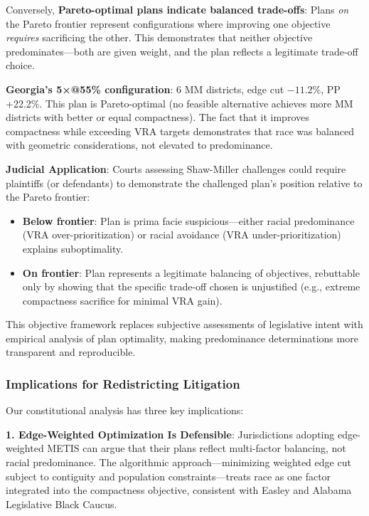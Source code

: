 Conversely, \textbf{Pareto-optimal plans indicate balanced trade-offs}: Plans \emph{on} the Pareto frontier represent configurations where improving one objective \emph{requires} sacrificing the other. This demonstrates that neither objective predominates---both are given weight, and the plan reflects a legitimate trade-off choice.

\textbf{Georgia's 5×@55\% configuration}: 6 MM districts, edge cut $-11.2$\%, PP +22.2\%. This plan is Pareto-optimal (no feasible alternative achieves more MM districts with better or equal compactness). The fact that it improves compactness while exceeding VRA targets demonstrates that race was balanced with geometric considerations, not elevated to predominance.

\textbf{Judicial Application}: Courts assessing Shaw-Miller challenges could require plaintiffs (or defendants) to demonstrate the challenged plan's position relative to the Pareto frontier:
\begin{itemize}
    \item \textbf{Below frontier}: Plan is prima facie suspicious---either racial predominance (VRA over-prioritization) or racial avoidance (VRA under-prioritization) explains suboptimality.
    \item \textbf{On frontier}: Plan represents a legitimate balancing of objectives, rebuttable only by showing that the specific trade-off chosen is unjustified (e.g., extreme compactness sacrifice for minimal VRA gain).
\end{itemize}

This objective framework replaces subjective assessments of legislative intent with empirical analysis of plan optimality, making predominance determinations more transparent and reproducible.

\subsubsection{Implications for Redistricting Litigation}

Our constitutional analysis has three key implications:

\textbf{1. Edge-Weighted Optimization Is Defensible}: Jurisdictions adopting edge-weighted METIS can argue that their plans reflect multi-factor balancing, not racial predominance. The algorithmic approach---minimizing weighted edge cut subject to contiguity and population constraints---treats race as one factor integrated into the compactness objective, consistent with Easley and Alabama Legislative Black Caucus.


